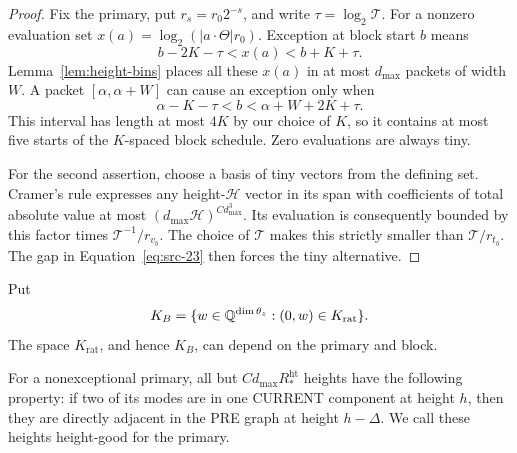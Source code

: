 \begin{proof}
Fix the primary, put \(r_s=r_0 2^{-s}\), and write
\(\tau=\log_2\mathcal T\).  For a nonzero evaluation set
\(x(a)=\log_2(|a\cdot\Theta|r_0)\).
Exception at block start \(b\) means
\[
 b-2K-\tau<x(a)<b+K+\tau.
\]
Lemma~\ref{lem:height-bins} places all these \(x(a)\) in at most
\(d_{\max}\) packets of width \(W\).
A packet \([\alpha,\alpha+W]\) can cause an exception only when
\[
 \alpha-K-\tau<b<\alpha+W+2K+\tau.
\]
This interval has length at most \(4K\) by our choice of \(K\), so it
contains at most five starts of the \(K\)-spaced block schedule.
Zero evaluations are always tiny.

For the second assertion, choose a basis of tiny vectors from the
defining set.  Cramer's rule expresses any height-\(\mathcal H\)
vector in its span with coefficients of total absolute value at most
\((d_{\max}\mathcal H)^{C d_{\max}^3}\).
Its evaluation is consequently bounded by this factor times
\(\mathcal T^{-1}/r_{v_b}\).  The choice of \(\mathcal T\) makes this
strictly smaller than \(\mathcal T/r_{t_b}\).
The gap in Equation~\eqref{eq:src-23} then forces the tiny alternative.
\end{proof}

Put
\[
 K_B=\{w\in\mathbb Q^{\dim\theta_z}:(0,w)\in K_{\mathrm{rat}}\}.
\]
The space \(K_{\mathrm{rat}}\), and hence \(K_B\), can depend on the
primary and block.

\begin{lemma}
\label{lem:height-stabilization}
For a nonexceptional primary, all but
\(C d_{\max}R_*^{\mathrm{ht}}\) heights have the following property:
if two of its modes are in one CURRENT component at height \(h\),
then they are directly adjacent in the PRE graph at height
\(h-\Delta\).  We call these heights height-good for the primary.
\end{lemma}

